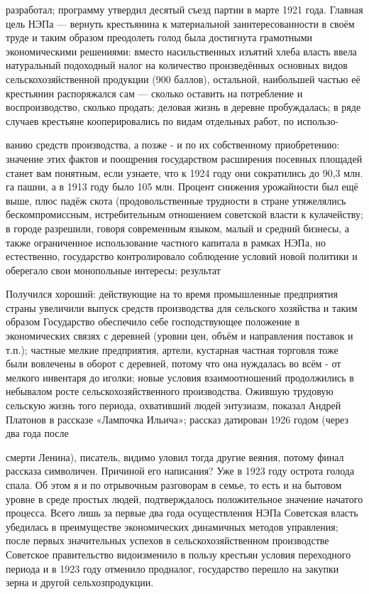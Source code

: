 разработал; программу утвердил десятый съезд партии в марте 1921 года. Главная цель НЭПа — вернуть крестьянина к материальной заинтересованности в своём труде и таким образом преодолеть голод была достигнута грамотными экономическими решениями: вместо насильственных изъятий хлеба власть ввела натуральный подоходный налог на количество произведённых основных видов сельскохозяйственной продукции (900 баллов), остальной, наибольшей частью её крестьянин распоряжался сам — сколько оставить на потребление и воспроизводство, сколько продать; деловая жизнь в деревне пробуждалась; в ряде случаев крестьяне кооперировались по видам отдельных работ, по использо-

ванию средств производства, а позже - и по их собственному приобретению: значение этих фактов и поощрения государством расширения посевных площадей станет вам понятным, если узнаете, что к 1924 году они сократились до 90,3 млн. га пашни, а в 1913 году было 105 млн. Процент снижения урожайности был ещё выше, плюс падёж скота (продовольственные трудности в стране утяжелялись бескомпромиссным, истребительным отношением советской власти к кулачейству; в городе разрешили, говоря современным языком, малый и средний бизнесы, а также ограниченное использование частного капитала в рамках НЭПа, но естественно, государство контролировало соблюдение условий новой политики и оберегало свои монопольные интересы; результат

Получился хороший: действующие на то время промышленные предприятия страны увеличили выпуск средств производства для сельского хозяйства и таким образом Государство обеспечило себе господствующее положение в экономических связях с деревней (уровни цен, объём и направления поставок и т.п.); частные мелкие предприятия, артели, кустарная частная торговля тоже были вовлечены в оборот с деревней, потому что она нуждалась во всём - от мелкого инвентаря до иголки; новые условия взаимоотношений продолжились в небывалом росте сельскохозяйственного производства. Ожившую трудовую сельскую жизнь того периода, охвативший людей энтузиазм, показал Андрей Платонов в рассказе «Лампочка Ильича»; рассказ датирован 1926 годом (через два года после

смерти Ленина), писатель, видимо уловил тогда другие веяния, потому финал рассказа символичен. Причиной его написания? Уже в 1923 году острота голода спала. Об этом я и по отрывочным разговорам в семье, то есть и на бытовом уровне в среде простых людей, подтверждалось положительное значение начатого процесса. Всего лишь за первые два года осуществления НЭПа Советская власть убедилась в преимуществе экономических динамичных методов управления; после первых значительных успехов в сельскохозяйственном производстве Советское правительство видоизменило в пользу крестьян условия переходного периода и в 1923 году отменило продналог, государство перешло на закупки зерна и другой сельхозпродукции.

